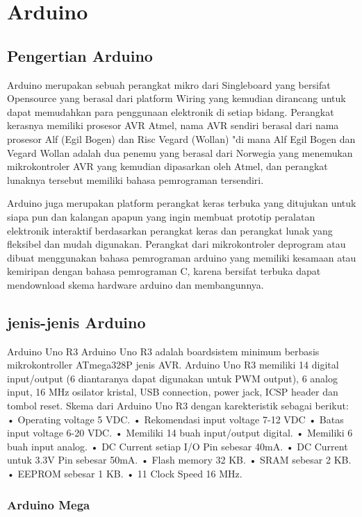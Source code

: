 \section{Arduino}
\subsection{Pengertian Arduino}
Arduino merupakan sebuah perangkat mikro dari Singleboard yang bersifat Opensource yang berasal dari platform Wiring yang kemudian dirancang untuk dapat memudahkan para penggunaan elektronik di setiap bidang. Perangkat kerasnya memiliki prosesor AVR Atmel, nama AVR sendiri berasal dari nama prosesor Alf (Egil Bogen) dan Risc Vegard (Wollan) "di mana Alf Egil Bogen dan Vegard Wollan adalah dua penemu yang berasal dari Norwegia yang menemukan mikrokontroler AVR yang kemudian dipasarkan oleh Atmel, dan perangkat lunaknya tersebut memiliki bahasa pemrograman tersendiri. 

Arduino juga merupakan platform perangkat keras terbuka yang ditujukan untuk siapa pun dan kalangan apapun yang ingin membuat prototip peralatan elektronik interaktif berdasarkan perangkat keras dan perangkat lunak yang fleksibel dan mudah digunakan. Perangkat dari mikrokontroler deprogram atau dibuat menggunakan bahasa pemrograman arduino yang memiliki kesamaan atau kemiripan dengan bahasa pemrograman C, karena bersifat terbuka dapat mendownload skema hardware arduino dan membangunnya. 

\subsection{jenis-jenis Arduino}
Arduino Uno R3
Arduino Uno R3 adalah boardsistem minimum berbasis mikrokontroller ATmega328P jenis AVR. Arduino Uno R3 memiliki 14 digital input/output (6
diantaranya dapat digunakan untuk PWM output), 6 analog input, 16 MHz osilator kristal, USB connection, power jack, ICSP header dan tombol reset. Skema dari Arduino Uno R3 dengan
karekteristik sebagai berikut:
• Operating voltage 5 VDC.
• Rekomendasi input voltage 7-12
VDC
• Batas input voltage 6-20 VDC.
• Memiliki 14 buah input/output
digital.
• Memiliki 6 buah input analog.
• DC Current setiap I/O Pin sebesar
40mA.
• DC Current untuk 3.3V Pin sebesar
50mA.
• Flash memory 32 KB.
• SRAM sebesar 2 KB.
• EEPROM sebesar 1 KB.
• 11 Clock Speed 16 MHz.

\subsubsection{Arduino Mega}

